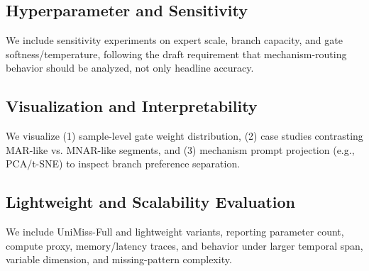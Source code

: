 \subsection{Hyperparameter and Sensitivity}
We include sensitivity experiments on expert scale, branch capacity, and gate softness/temperature, following the draft requirement that mechanism-routing behavior should be analyzed, not only headline accuracy.

\subsection{Visualization and Interpretability}
We visualize (1) sample-level gate weight distribution, (2) case studies contrasting MAR-like vs. MNAR-like segments, and (3) mechanism prompt projection (e.g., PCA/t-SNE) to inspect branch preference separation.

\subsection{Lightweight and Scalability Evaluation}
We include UniMiss-Full and lightweight variants, reporting parameter count, compute proxy, memory/latency traces, and behavior under larger temporal span, variable dimension, and missing-pattern complexity.
